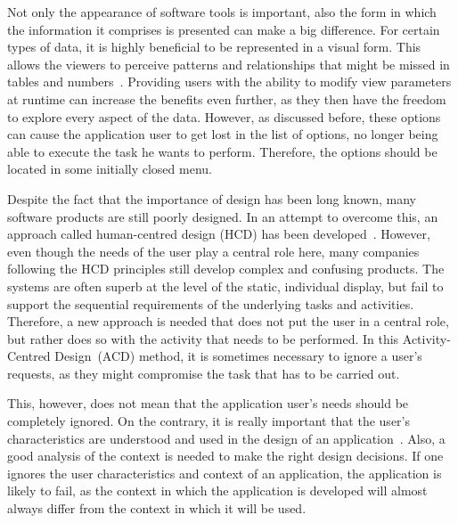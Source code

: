 Not only the appearance of software tools is important, also the form in which the information it comprises is presented can make a big difference. For certain types of data, it is highly beneficial to be represented in a visual form. This allows the viewers to perceive patterns and relationships that might be missed in tables and numbers~\cite{gallopoulos1994computer}. Providing users with the ability to modify view parameters at runtime can increase the benefits even further, as they then have the freedom to explore every aspect of the data. However, as discussed before, these options can cause the application user to get lost in the list of options, no longer being able to execute the task he wants to perform. Therefore, the options should be located in some initially closed menu.

Despite the fact that the importance of design has been long known, many software products are still poorly designed. In an attempt to overcome this, an approach called human-centred design (HCD) has been developed~\cite{norman2005human}. However, even though the needs of the user play a central role here, many companies following the HCD principles still develop complex and confusing products. The systems are often superb at the level of the static, individual display, but fail to support the sequential requirements of the underlying tasks and activities. Therefore, a new approach is needed that does not put the user in a central role, but rather does so with the activity that needs to be performed. In this Activity-Centred Design~(ACD) method, it is sometimes necessary to ignore a user's requests, as they might compromise the task that has to be carried out.

This, however, does not mean that the application user's needs should be completely ignored. On the contrary, it is really important that the user's characteristics are understood and used in the design of an application~\cite{badre2002shaping}. Also, a good analysis of the context is needed to make the right design decisions. If one ignores the user characteristics and context of an application, the application is  likely to fail, as the context in which the application is developed will almost always differ from the context in which it will be used.

